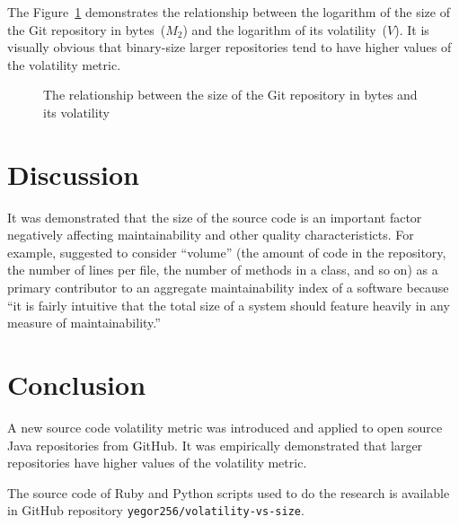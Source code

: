 \documentclass[12pt]{article}
\begin{document}
The Figure~\ref{fig:2} demonstrates the relationship between
the logarithm of the size of the Git repository in bytes~($M_2$) and
the logarithm of its volatility~($V$).
It is visually obvious that
binary-size larger repositories tend to have higher values
of the volatility metric.

\begin{figure}[h]
  
  \caption{The relationship between the size of the Git repository in bytes and its volatility}
  \label{fig:2}
\end{figure}

\section{Discussion}

It was demonstrated that the size of the source code is an important
factor negatively affecting maintainability and other quality characteristicts.
For example, \citet{heitlager2007} suggested to consider ``volume'' (the amount of code
in the repository, the number of lines per file, the number of methods in a class,
and so on) as a primary contributor to an aggregate maintainability index
of a software because ``it is fairly intuitive that the total size of a system should
feature heavily in any measure of maintainability.''

\section{Conclusion}

A new source code volatility metric was introduced and applied
to \thetotalrepos{} open source Java repositories from GitHub. It was
empirically demonstrated that larger repositories have higher values
of the volatility metric.

The source code of Ruby and Python scripts used to do the research
is available in GitHub repository \texttt{yegor256/volatility-vs-size}.


\end{document}
